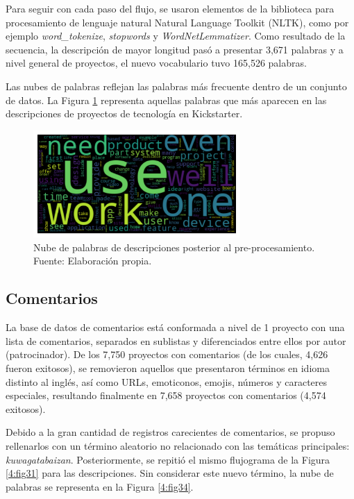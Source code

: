 Para seguir con cada paso del flujo, se usaron elementos de la biblioteca para procesamiento de lenguaje natural Natural Language Toolkit (NLTK), como por ejemplo \textit{word\_tokenize}, \textit{stopwords} y \textit{WordNetLemmatizer}. Como resultado de la secuencia, la descripción de mayor longitud pasó a presentar 3,671 palabras y a nivel general de proyectos, el nuevo vocabulario tuvo 165,526 palabras.

Las nubes de palabras reflejan las palabras más frecuente dentro de un conjunto de datos. La Figura \ref{4:fig33} representa aquellas palabras que más aparecen en las descripciones de proyectos de tecnología en Kickstarter.

\begin{figure}[!ht]
	\begin{center}
		\includegraphics[width=0.7\textwidth]{4/figures/description_wordcloud.png}
		\caption{Nube de palabras de descripciones posterior al pre-procesamiento. Fuente: Elaboración propia.}
		\label{4:fig33}
	\end{center}
\end{figure}

\subsection{Comentarios}
La base de datos de comentarios está conformada a nivel de 1 proyecto con una lista de comentarios, separados en sublistas y diferenciados entre ellos por autor (patrocinador). De los 7,750 proyectos con comentarios (de los cuales, 4,626 fueron exitosos), se removieron aquellos que presentaron términos en idioma distinto al inglés, así como URLs, emoticonos, emojis, números y caracteres especiales, resultando finalmente en 7,658 proyectos con comentarios (4,574 exitosos).

Debido a la gran cantidad de registros carecientes de comentarios, se propuso rellenarlos con un término aleatorio no relacionado con las temáticas principales: \textit{kuwagatabaizan}. Posteriormente, se repitió el mismo flujograma de la Figura \ref{4:fig31} para las descripciones. Sin considerar este nuevo término, la nube de palabras se representa en la Figura \ref{4:fig34}.

